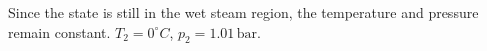 Since the state is still in the wet steam region, the temperature and pressure remain constant.  
\( T_2 = 0^\circ C \), \( p_2 = 1.01 \, \text{bar} \).